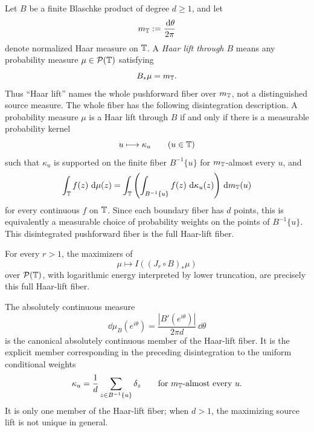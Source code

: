 \begin{lemma}\label{lem:finite-blaschke-haar-lift-fiber}
Let \(B\) be a finite Blaschke product of degree \(d\ge1\), and let
\[
m_{\mathbb{T}}:=\frac{\,\mathrm{d}\theta}{2\pi}
\]
denote normalized Haar measure on \(\mathbb{T}\).  A \emph{Haar lift through
\(B\)} means any probability measure \(\mu\in\mathcal P(\mathbb{T})\) satisfying
\[
B_\ast\mu=m_{\mathbb{T}}.
\]
Thus ``Haar lift'' names the whole pushforward fiber over \(m_{\mathbb{T}}\), not
a distinguished source measure.  The whole fiber has the following
disintegration description.  A probability measure \(\mu\) is a Haar lift
through \(B\) if and only if there is a measurable probability kernel
\[
u\longmapsto \kappa_u
\qquad (u\in\mathbb{T})
\]
such that \(\kappa_u\) is supported on the finite fiber \(B^{-1}\{u\}\) for
\(m_{\mathbb{T}}\)-almost every \(u\), and
\[
\int_{\mathbb{T}} f(z)\,\,\mathrm{d}\mu(z)
=\int_{\mathbb{T}}\left(\int_{B^{-1}\{u\}} f(z)\,\,\mathrm{d}\kappa_u(z)\right)\,\mathrm{d} m_{\mathbb{T}}(u)
\]
for every continuous \(f\) on \(\mathbb{T}\).  Since each boundary fiber has
\(d\) points, this is equivalently a measurable choice of probability
weights on the points of \(B^{-1}\{u\}\).  This disintegrated pushforward
fiber is the full Haar-lift fiber.

For every \(r>1\), the maximizers of
\[
\mu\longmapsto I((J_r\circ B)_\ast\mu)
\]
over \(\mathcal P(\mathbb{T})\), with logarithmic energy interpreted by lower
truncation, are precisely this full Haar-lift fiber.

The absolutely continuous measure
\[
\boxed{\;
\dd\mu_B(e^{i\theta})
=\frac{|B'(e^{i\theta})|}{2\pi d}\,\dd\theta
\;}
\]
is the canonical absolutely continuous member of the Haar-lift fiber.  It
is the explicit member corresponding in the preceding disintegration to the
uniform conditional weights
\[
\kappa_u=\frac1d\sum_{z\in B^{-1}\{u\}}\delta_z
\qquad\text{for }m_{\mathbb{T}}\text{-almost every }u.
\]
It is only one member of the Haar-lift fiber; when \(d>1\), the maximizing
source lift is not unique in general.
\end{lemma}

